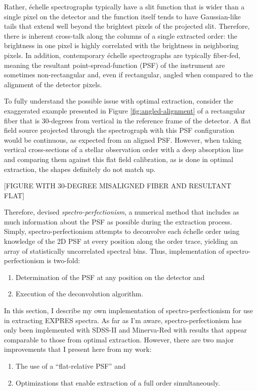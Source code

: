 Rather, \'{e}chelle spectrographs typically have a slit function that is wider than a single pixel on the detector and the function itself tends to have Gaussian-like tails that extend well beyond the brightest pixels of the projected slit. Therefore, there is inherent cross-talk along the columns of a single extracted order: the brightness in one pixel is highly correlated with the brightness in neighboring pixels. In addition, contemporary \'{e}chelle spectrographs are typically fiber-fed, meaning the resultant point-spread-function (PSF) of the instrument are sometimes non-rectangular and, even if rectangular, angled when compared to the alignment of the detector pixels.

To fully understand the possible issue with optimal extraction, consider the exaggerated example presented in Figure \ref{fig:angled-alignment} of a rectangular fiber that is 30-degrees from vertical in the reference frame of the detector. A flat field source projected through the spectrograph with this PSF configuration would be continuous, as expected from an aligned PSF. However, when taking vertical cross-sections of a stellar observation order with a deep absorption line and comparing them against this flat field calibration, as is done in optimal extraction, the shapes definitely do not match up.

[FIGURE WITH 30-DEGREE MISALIGNED FIBER AND RESULTANT FLAT]

Therefore, \citet{bolton_spectro-perfectionism_2009} devised \textit{spectro-perfectionism}, a numerical method that includes as much information about the PSF as possible during the extraction process. Simply, spectro-perfectionism attempts to deconvolve each \'{e}chelle order using knowledge of the 2D PSF at every position along the order trace, yielding an array of statistically uncorrelated spectral bins. Thus, implementation of spectro-perfectionism is two-fold:
\begin{enumerate}
    \item Determination of the PSF at any position on the detector and
    \item Execution of the deconvolution algorithm.
\end{enumerate}

In this section, I describe my own implementation of spectro-perfectionism for use in extracting EXPRES spectra. As far as I'm aware, spectro-perfectionism has only been implemented with SDSS-II \citep{bolton_spectro-perfectionism_2009} and Minerva-Red \citep{cornachione_full_2019} with results that appear comparable to those from optimal extraction. However, there are two major improvements that I present here from my work:
\begin{enumerate}
    \item The use of a ``flat-relative PSF'' and
    \item Optimizations that enable extraction of a full order simultaneously.
\end{enumerate}

